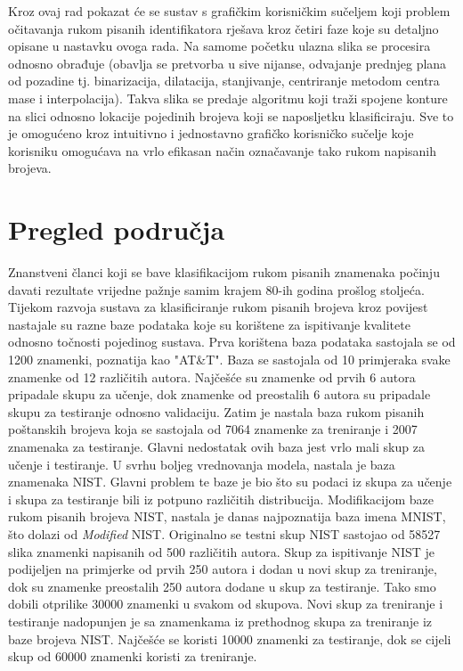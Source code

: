 \documentclass[times, utf8, diplomski]{fer}
\theoremstyle{definition}
\begin{document}
Kroz ovaj rad pokazat će se sustav s grafičkim korisničkim sučeljem  koji problem očitavanja rukom pisanih identifikatora rješava kroz četiri faze koje su detaljno opisane u nastavku ovoga rada. Na samome početku ulazna slika se procesira odnosno obrađuje (obavlja se pretvorba u sive nijanse, odvajanje prednjeg plana od pozadine tj. binarizacija, dilatacija, stanjivanje, centriranje metodom centra mase i interpolacija). Takva slika se predaje algoritmu koji traži spojene konture na slici odnosno lokacije pojedinih brojeva koji se naposljetku klasificiraju. Sve to je omogućeno kroz intuitivno i jednostavno grafičko korisničko sučelje koje korisniku omogućava na vrlo efikasan način označavanje tako rukom napisanih brojeva.
\chapter{Pregled područja}
Znanstveni članci koji se bave klasifikacijom rukom pisanih znamenaka počinju davati rezultate vrijedne pažnje samim krajem 80-ih godina prošlog stoljeća. Tijekom razvoja sustava za klasificiranje rukom pisanih brojeva kroz povijest nastajale su razne baze podataka koje su korištene za ispitivanje kvalitete odnosno točnosti pojedinog sustava. Prva korištena baza podataka sastojala se od 1200 znamenki, poznatija kao "AT\&T". Baza se sastojala od 10 primjeraka svake znamenke od 12 različitih autora. Najčešće su znamenke od prvih 6 autora pripadale skupu za učenje, dok znamenke od preostalih 6 autora su pripadale skupu za testiranje odnosno validaciju. Zatim je nastala baza rukom pisanih poštanskih brojeva koja se sastojala od 7064 znamenke za treniranje i 2007 znamenaka za testiranje. Glavni nedostatak ovih baza jest vrlo mali skup za učenje i testiranje. U svrhu boljeg vrednovanja modela, nastala je baza znamenaka NIST. Glavni problem te baze je bio što su podaci iz skupa za učenje i skupa za testiranje bili iz potpuno različitih distribucija. Modifikacijom baze rukom pisanih brojeva NIST, nastala je danas najpoznatija baza imena MNIST, što dolazi od \textit{Modified} NIST. Originalno se testni skup NIST sastojao od 58527 slika znamenki napisanih od 500 različitih autora. Skup za ispitivanje NIST je podijeljen na primjerke od prvih 250 autora i dodan u novi skup za treniranje, dok su znamenke preostalih 250 autora dodane u skup za testiranje. Tako smo dobili otprilike 30000 znamenki u svakom od skupova. Novi skup za treniranje i testiranje nadopunjen je sa znamenkama iz prethodnog skupa za treniranje iz baze brojeva NIST. Najčešće se koristi 10000 znamenki za testiranje, dok se cijeli skup od 60000 znamenki koristi za treniranje.
\end{document}
